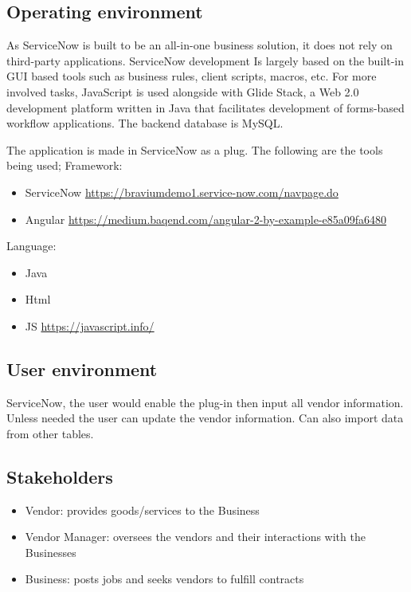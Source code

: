 \documentclass[10pt]{article}
\begin{document}
\subsection{Operating environment}
As ServiceNow is built to be an all-in-one business solution, it does not rely on third-party applications. 
ServiceNow development Is largely based on the built-in GUI based tools such as business rules, client scripts, macros, etc. For more involved tasks, JavaScript is used alongside with Glide Stack, a Web 2.0 development platform written in Java that facilitates development of forms-based workflow applications. The backend database is MySQL.

The application is made in ServiceNow as a plug. The following are the tools being used;
Framework:
\begin{itemize}
	\item ServiceNow \url{https://braviumdemo1.service-now.com/navpage.do}
	\item Angular \url{https://medium.baqend.com/angular-2-by-example-e85a09fa6480}
\end{itemize}
Language:
\begin{itemize}
	\item Java
	\item Html
	\item JS \url{https://javascript.info/}
\end{itemize}


\subsection{User environment}

ServiceNow, the user would enable the plug-in then input all vendor information. Unless needed the user can update the vendor information. Can also import data from other tables. 

\subsection{Stakeholders}
\begin{itemize}
	\item	Vendor: provides goods/services to the Business
	\item	Vendor Manager: oversees the vendors and their interactions with the Businesses
	\item	Business: posts jobs and seeks vendors to fulfill contracts  
	
\end{itemize}
\end{document}
